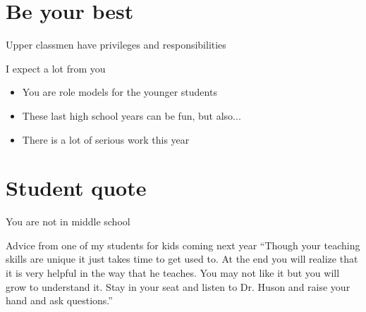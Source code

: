 \documentclass[onlytextwidth]{beamer}
\begin{document}
\section{Be your best}
\begin{frame}{Upper classmen have privileges and responsibilities}
  \begin{block}{I expect a lot from you}
    \begin{itemize}
      \item You are role models for the younger students
      \item These last high school years can be fun, but also...
      \item There is a lot of serious work this year
    \end{itemize}
    \end{block}
  \end{frame}

\section{Student quote}
\begin{frame}{You are not in middle school}
  \begin{block}{Advice from one of my students for kids coming next year}\vspace{0.5cm}
    ``Though your teaching skills are unique it just takes time to get used to. At the end you will realize that it is very helpful in the way that he teaches. You may not like it but you will grow to understand it. Stay in your seat and listen to Dr. Huson and raise your hand and ask questions.''
  \end{block}
  \end{frame}
\end{document}
